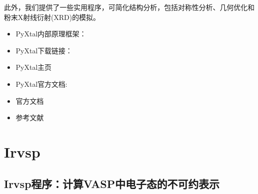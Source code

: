 \documentclass[a4paper,12pt,english]{sphinxmanual}
\begin{document}
\sphinxAtStartPar
此外，我们提供了一些实用程序，可简化结构分析，包括对称性分析、几何优化和粉末X射线衍射(XRD)的模拟。
\begin{itemize}
\item {} 
\sphinxAtStartPar
PyXtal内部原理框架：

\end{itemize}

\noindent{}
\begin{itemize}
\item {} 
\sphinxAtStartPar
PyXtal下载链接：%
\begin{footnote}[7]\sphinxAtStartFootnote
{}
%
\end{footnote}

\item {} 
\sphinxAtStartPar
PyXtal主页

\end{itemize}

\noindent{}
\begin{itemize}
\item {} 
\sphinxAtStartPar
PyXtal官方文档: %
\begin{footnote}[8]\sphinxAtStartFootnote
{}
%
\end{footnote}

\item {} 
\sphinxAtStartPar
官方文档

\end{itemize}

\noindent{}
\begin{itemize}
\item {} 
\sphinxAtStartPar
参考文献

\end{itemize}

\noindent{}


\section{Irvsp}
\label{\detokenize{code:irvsp}}

\subsection{Irvsp程序：计算VASP中电子态的不可约表示}
\label{\detokenize{code/Irvsp:irvsp-vasp}}\label{\detokenize{code/Irvsp::doc}}
\sphinxAtStartPar
{}
\end{document}
